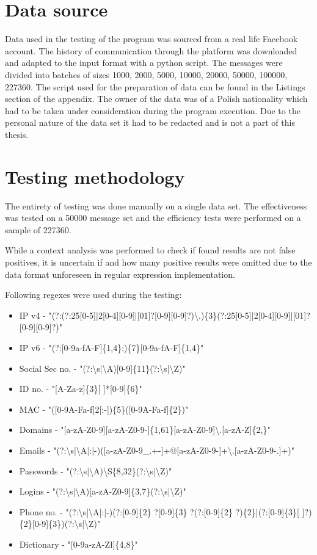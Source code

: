 \documentclass[a4paper,twoside,12pt]{book}
\begin{document}
\section{Data source}

Data used in the testing of the program was sourced from a real life Facebook account. The history of communication through the platform was downloaded and adapted to the input format with a python script.
The messages were divided into batches of sizes 1000, 2000, 5000, 10000, 20000, 50000, 100000, 227360. The script used for the preparation of data can be found in the Listings section of the appendix.
The owner of the data was of a Polish nationality which had to be taken under consideration during the program execution. Due to the personal nature of the data set it had to be 
redacted and is not a part of this thesis.

\section{Testing methodology}

The entirety of testing was done manually on a single data set. The effectiveness was tested on a 50000 message set and
the efficiency tests were performed on a sample of 227360.

While a context analysis was performed to check if found results are not false positives, it is uncertain if and how many
positive results were omitted due to the data format unforeseen in regular expression implementation. 

Following regexes were used during the testing: 

\begin{itemize}
   \item IP v4 - "(?:(?:25[0-5]|2[0-4][0-9]|[01]?[0-9][0-9]?)\textbackslash .)\{3\}(?:25[0-5]|2[0-4][0-9]|[01]?[0-9][0-9]?)" 
   \item IP v6 - "(?:[0-9a-fA-F]\{1,4\}:)\{7\}[0-9a-fA-F]\{1,4\}"
   \item Social Sec no. - "(?:\textbackslash s|\textbackslash A)[0-9]\{11\}(?:\textbackslash s|\textbackslash Z)"
   \item ID no. - "[A-Za-z]\{3\}[ ]*[0-9]\{6\}"
   \item MAC - "([0-9A-Fa-f]{2}[:-])\{5\}([0-9A-Fa-f]\{2\})"
   \item Domains - "[a-zA-Z0-9][a-zA-Z0-9-]\{1,61\}[a-zA-Z0-9]\textbackslash .[a-zA-Z]\{2,\}"
   \item Emails - "(?:\textbackslash s|\textbackslash A|:|-)([a-zA-Z0-9\_.+-]+@[a-zA-Z0-9-]+\textbackslash .[a-zA-Z0-9-.]+)"
   \item Passwords - "(?:\textbackslash s|\textbackslash A)\textbackslash S\{8,32\}(?:\textbackslash s|\textbackslash Z)"
   \item Logins - "(?:\textbackslash s|\textbackslash A)[a-zA-Z0-9]\{3,7\}(?:\textbackslash s|\textbackslash Z)"
   \item Phone no. - "(?:\textbackslash s|\textbackslash A|:|-)(?:[0-9]\{2\} ?[0-9]\{3\} ?(?:[0-9]\{2\} ?)\{2\}|(?:[0-9]\{3\}[ ]?)\{2\}[0-9]\{3\})(?:\textbackslash s|\textbackslash Z)"
   \item Dictionary - "[0-9a-zA-Zł]\{4,8\}"
\end{itemize}
\end{document}

